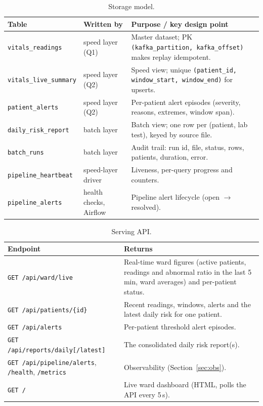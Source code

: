 \documentclass[11pt,a4paper]{article}
\newcommand{\code}[1]{\nolinkurl{#1}}
\begin{document}
\begin{table}[!ht]
\centering\small
\begin{tabularx}{\textwidth}{@{}P{4.0cm}P{2.6cm}L@{}}
\toprule
\textbf{Table} & \textbf{Written by} & \textbf{Purpose / key design point} \\
\midrule
\code{vitals_readings} & speed layer (Q1) & Master dataset; PK \code{(kafka_partition, kafka_offset)} makes replay idempotent. \\
\code{vitals_live_summary} & speed layer (Q2) & Speed view; unique \code{(patient_id, window_start, window_end)} for upserts. \\
\code{patient_alerts} & speed layer (Q2) & Per-patient alert episodes (severity, reasons, extremes, window span). \\
\code{daily_risk_report} & batch layer & Batch view; one row per (patient, lab test), keyed by source file. \\
\code{batch_runs} & batch layer & Audit trail: run id, file, status, rows, patients, duration, error. \\
\code{pipeline_heartbeat} & speed-layer driver & Liveness, per-query progress and counters. \\
\code{pipeline_alerts} & health checks, Airflow & Pipeline alert lifecycle (open $\rightarrow$ resolved). \\
\bottomrule
\end{tabularx}
\caption{Storage model.}
\label{tab:tables}
\end{table}

\begin{table}[!ht]
\centering\small
\begin{tabularx}{\textwidth}{@{}P{5.6cm}L@{}}
\toprule
\textbf{Endpoint} & \textbf{Returns} \\
\midrule
\code{GET /api/ward/live} & Real-time ward figures (active patients, readings and abnormal ratio in the last 5 min, ward averages) and per-patient status. \\
\code{GET /api/patients/{id}} & Recent readings, windows, alerts and the latest daily risk for one patient. \\
\code{GET /api/alerts} & Per-patient threshold alert episodes. \\
\code{GET /api/reports/daily[/latest]} & The consolidated daily risk report(s). \\
\code{GET /api/pipeline/alerts}, \code{/health}, \code{/metrics} & Observability (Section~\ref{sec:obs}). \\
\code{GET /} & Live ward dashboard (HTML, polls the API every 5\,s). \\
\bottomrule
\end{tabularx}
\caption{Serving API.}
\end{table}
\end{document}
